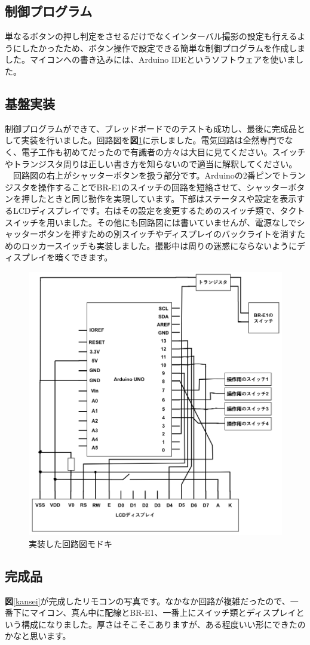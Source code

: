 \documentclass[../main]{subfiles}
\begin{document}
\subsection{制御プログラム}
単なるボタンの押し判定をさせるだけでなくインターバル撮影の設定も行えるようにしたかったため、ボタン操作で設定できる簡単な制御プログラムを作成しました。マイコンへの書き込みには、Arduino IDEというソフトウェアを使いました。


\subsection{基盤実装}
制御プログラムができて、ブレッドボードでのテストも成功し、最後に完成品として実装を行いました。回路図を\textbf{図}\ref{kairozu}に示しました。電気回路は全然専門でなく、電子工作も初めてだったので有識者の方々は大目に見てください。スイッチやトランジスタ周りは正しい書き方を知らないので適当に解釈してください。\\
　回路図の右上がシャッターボタンを扱う部分です。Arduinoの2番ピンでトランジスタを操作することでBR-E1のスイッチの回路を短絡させて、シャッターボタンを押したときと同じ動作を実現しています。下部はステータスや設定を表示するLCDディスプレイです。右はその設定を変更するためのスイッチ類で、タクトスイッチを用いました。その他にも回路図には書いていませんが、電源なしでシャッターボタンを押すための別スイッチやディスプレイのバックライトを消すためのロッカースイッチも実装しました。撮影中は周りの迷惑にならないようにディスプレイを暗くできます。

\begin{figure}
    \centering
    \includegraphics[width=0.5\linewidth]{sections/Maruyama/figure/kairozu.png}
    \caption{実装した回路図モドキ}
    \label{kairozu}
\end{figure}

\subsection{完成品}
\textbf{図}\ref{kansei}が完成したリモコンの写真です。なかなか回路が複雑だったので、一番下にマイコン、真ん中に配線とBR-E1、一番上にスイッチ類とディスプレイという構成になりました。厚さはそこそこありますが、ある程度いい形にできたのかなと思います。
\end{document}
